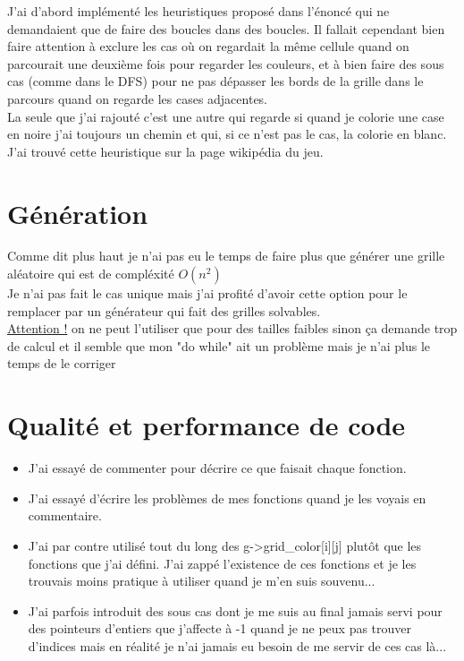 \documentclass{article}
\begin{document}
J'ai d'abord implémenté les heuristiques proposé dans l'énoncé qui ne demandaient que de faire des boucles dans des boucles. Il fallait cependant bien faire attention à exclure les cas où on regardait la même cellule quand on parcourait une deuxième fois pour regarder les couleurs, et à bien faire des sous cas (comme dans le DFS) pour ne pas dépasser les bords de la grille dans le parcours quand on regarde les cases adjacentes.\\

La seule que j'ai rajouté c'est une autre qui regarde si quand je colorie une case en noire j'ai toujours un chemin et qui, si ce n'est pas le cas, la colorie en blanc. J'ai trouvé cette heuristique sur la page wikipédia du jeu.

\newpage
\section{Génération} 

Comme dit plus haut je n'ai pas eu le temps de faire plus que générer une grille aléatoire qui est de compléxité $O(n^2)$\\

Je n'ai pas fait le cas unique mais j'ai profité d'avoir cette option pour le remplacer par un générateur qui fait des grilles solvables.\\

\underline{Attention !} on ne peut l'utiliser que pour des tailles faibles sinon ça demande trop de calcul et il semble que mon "do while" ait un problème mais je n'ai plus le temps de le corriger 

\newpage
\section{Qualité et performance de code}

\begin{itemize}
    \item J'ai essayé de commenter pour décrire ce que faisait chaque fonction.\\
    \item J'ai essayé d'écrire les problèmes de mes fonctions quand je les voyais en commentaire.\\
    \item J'ai par contre utilisé tout du long des g->grid\_color[i][j] plutôt que les fonctions que j'ai défini. J'ai zappé l'existence de ces fonctions et je les trouvais moins pratique à utiliser quand je m'en suis souvenu...\\
    \item J'ai parfois introduit des sous cas dont je me suis au final jamais servi pour des pointeurs d'entiers que j'affecte à -1 quand je ne peux pas trouver d'indices mais en réalité je n'ai jamais eu besoin de me servir de ces cas là...
\end{itemize}
\end{document}
